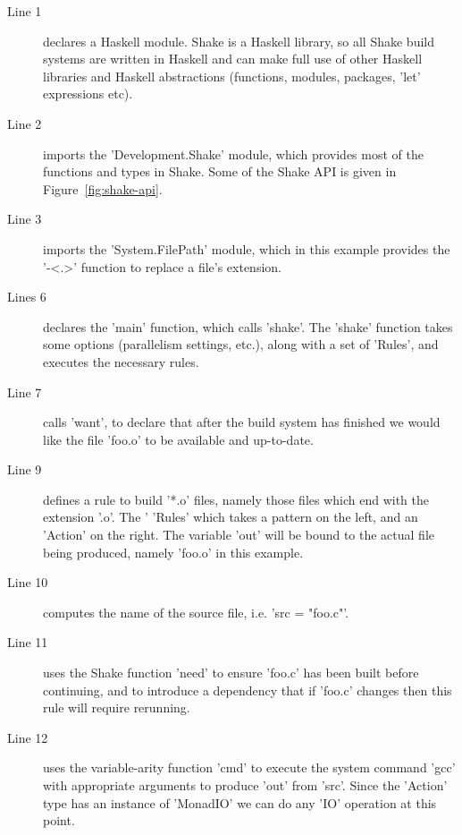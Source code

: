 \begin{description}
\item[Line 1] declares a Haskell module. Shake is a Haskell library, so all
Shake build systems are written in Haskell and can make full use of other
Haskell libraries and Haskell abstractions (functions, modules, packages,
\lst'let' expressions etc).
\item[Line 2] imports the \lst'Development.Shake' module, which provides most of
the functions and types in Shake. Some of the Shake API is given in
Figure~\ref{fig:shake-api}.
\item[Line 3] imports the \lst'System.FilePath' module, which in this example
provides the \lst'-<.>' function to replace a file's extension.
\item[Lines 6] declares the \lst'main' function, which calls \lst'shake'. The
\lst'shake' function takes some options (parallelism settings, etc.), along with
a set of \lst'Rules', and executes the necessary rules.
\item[Line 7] calls \lst'want', to declare that after the build system has
finished we would like the file \lst'foo.o' to be available and up-to-date.
\item[Line 9] defines a rule to build \lst'*.o' files, namely those files which
end with the extension \lst'.o'. The \lst'%
\lst'Rules' which takes a pattern on the left, and an \lst'Action' on the
right. The variable \lst'out' will be bound to the actual file being produced,
namely \lst'foo.o' in this example.
\item[Line 10] computes the name of the source file, i.e. \lst'src = "foo.c"'.
\item[Line 11] uses the Shake function \lst'need' to ensure \lst'foo.c' has been built before
continuing, and to introduce a dependency that if \lst'foo.c' changes then this
rule will require rerunning.
\item[Line 12] uses the variable-arity function \lst'cmd' to execute the system
command \lst'gcc' with appropriate arguments to produce \lst'out' from
\lst'src'. Since the \lst'Action' type has an instance of \lst'MonadIO' we can
do any \lst'IO' operation at this point.
\end{description}

